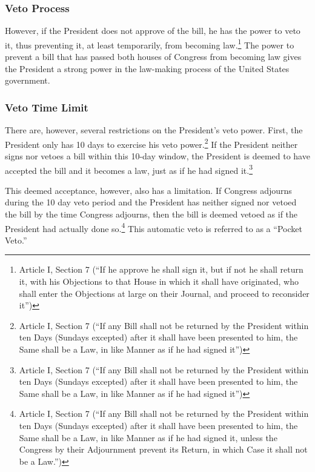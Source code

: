 \subsubsection{Veto Process}
However, if the President does not approve of the bill, he has the power to veto it, thus preventing it, at least temporarily, from becoming law.\footnote{Article I, Section 7 (``If he approve he shall sign it, but if not he shall return it, with his Objections to that House in which it shall have originated, who shall enter the Objections at large on their Journal, and proceed to reconsider it'')}
The power to prevent a bill that has passed both houses of Congress from becoming law gives the President a strong power in the law-making process of the United States government.

\subsubsection{Veto Time Limit}
There are, however, several restrictions on the President's veto power.  First, the President only has 10 days to exercise his veto power.\footnote{Article I, Section 7 (``If any Bill shall not be returned by the President within ten Days (Sundays excepted) after it shall have been presented to him, the Same shall be a Law, in like Manner as if he had signed it'')}  If the President neither signs nor vetoes a bill within this 10-day window, the President is deemed to have accepted the bill and it becomes a law, just as if he had signed it.\footnote{Article I, Section 7 (``If any Bill shall not be returned by the President within ten Days (Sundays excepted) after it shall have been presented to him, the Same shall be a Law, in like Manner as if he had signed it'')}

This deemed acceptance, however, also has a limitation.  If Congress adjourns during the 10 day veto period and the President has neither signed nor vetoed the bill by the time Congress adjourns, then the bill is deemed vetoed as if the President had actually done so.\footnote{Article I, Section 7 (``If any Bill shall not be returned by the President within ten Days (Sundays excepted) after it shall have been presented to him, the Same shall be a Law, in like Manner as if he had signed it, unless the Congress by their Adjournment prevent its Return, in which Case it shall not be a Law.'')}
This automatic veto is referred to as a ``Pocket Veto.''

